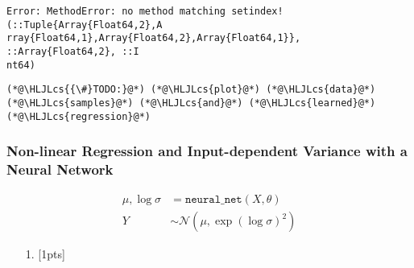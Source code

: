 \documentclass[12pt,a4paper]{article}
\newcommand{\HLJLcs}[1]{\textcolor[RGB]{153,153,119}{\textit{#1}}}
\begin{document}
\begin{lstlisting}
Error: MethodError: no method matching setindex!(::Tuple{Array{Float64,2},A
rray{Float64,1},Array{Float64,2},Array{Float64,1}}, ::Array{Float64,2}, ::I
nt64)
\end{lstlisting}


\begin{lstlisting}
(*@\HLJLcs{{\#}TODO:}@*) (*@\HLJLcs{plot}@*) (*@\HLJLcs{data}@*) (*@\HLJLcs{samples}@*) (*@\HLJLcs{and}@*) (*@\HLJLcs{learned}@*) (*@\HLJLcs{regression}@*)
\end{lstlisting}


\subsubsection{Non-linear Regression and Input-dependent Variance with a Neural Network}

\begin{align*}
\mu, \log \sigma &= \texttt{neural\_net}(X,\theta)\\
Y &\sim \mathcal{N}(\mu, \exp(\log \sigma)^2)
\end{align*}
\begin{itemize}
\item[1. ] [1pts]

\end{itemize}
\end{document}
